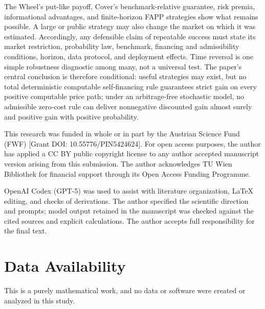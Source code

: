 \documentclass[aps,pra,reprint,superscriptaddress,amsmath,amssymb,floatfix]{revtex4-2}
\theoremstyle{plain}
\theoremstyle{definition}
\theoremstyle{remark}
\begin{document}
The Wheel's put-like payoff, Cover's benchmark-relative guarantee, risk
premia, informational advantages, and finite-horizon FAPP strategies show what
remains possible. A large or public strategy may also change the market on
which it was estimated. Accordingly, any defensible claim of repeatable
success must state its market restriction, probability law, benchmark,
financing and admissibility conditions, horizon, data protocol, and deployment
effects. Time reversal is one simple robustness diagnostic among many, not a
universal test. The paper's central conclusion is therefore conditional:
useful strategies may exist, but no total deterministic computable
self-financing rule guarantees strict gain on every positive computable price
path; under an arbitrage-free stochastic model, no admissible zero-cost rule
can deliver nonnegative discounted gain almost surely and positive gain with
positive probability.

\begin{acknowledgments}
This research was funded in whole or in part by the Austrian Science Fund
(FWF) [Grant DOI: 10.55776/PIN5424624]. For open access purposes, the author
has applied a CC BY public copyright license to any author accepted manuscript
version arising from this submission. The author acknowledges TU Wien
Bibliothek for financial support through its Open Access Funding Programme.

OpenAI Codex (GPT-5) was used to assist with literature organization, LaTeX
editing, and checks of derivations. The author specified the scientific
direction and prompts; model output retained in the manuscript was checked
against the cited sources and explicit calculations. The author accepts full
responsibility for the final text.
\end{acknowledgments}

\section*{Data Availability}
This is a purely mathematical work, and no data or software were created or
analyzed in this study.


\end{document}
